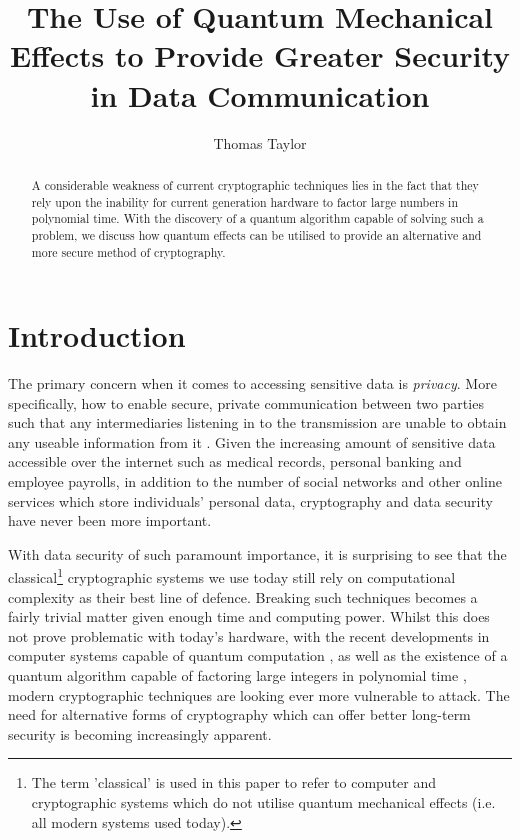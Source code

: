 \documentclass[runningheads,a4paper]{llncs}
\begin{document}
\mainmatter  

\title{The Use of Quantum Mechanical Effects to Provide Greater Security in Data Communication}
\author{Thomas Taylor\\ \mail}

\maketitle

\begin{abstract}
A considerable weakness of current cryptographic techniques lies in the fact that they rely upon the inability for current generation hardware to factor large numbers in polynomial time. With the discovery of a quantum algorithm capable of solving such a problem, we discuss how quantum effects can be utilised to provide an alternative and more secure method of cryptography.

\end{abstract}

\section{Introduction}

The primary concern when it comes to accessing sensitive data is \emph{privacy}. More specifically, how to enable secure, private communication between two parties such that any intermediaries listening in to the transmission are unable to obtain any useable information from it \cite{Rivest:1990fk}. Given the increasing amount of sensitive data accessible over the internet such as medical records, personal banking and employee payrolls, in addition to the number of social networks and other online services which store individuals' personal data, cryptography and data security have never been more important.

With data security of such paramount importance, it is surprising to see that the classical\footnote[1]{The term 'classical' is used in this paper to refer to computer and cryptographic systems which do not utilise quantum mechanical effects (i.e. all modern systems used today).} cryptographic systems we use today still rely on computational complexity as their best line of defence. Breaking such techniques becomes a fairly trivial matter given enough time and computing power. Whilst this does not prove problematic with today's hardware, with the recent developments in computer systems capable of quantum computation \cite{Lu:2007uq}, as well as the existence of a quantum algorithm capable of factoring large integers in polynomial time \cite{Shor:1994fk}, modern cryptographic techniques are looking ever more vulnerable to attack. The need for alternative forms of cryptography which can offer better long-term security is becoming increasingly apparent.
\end{document}
